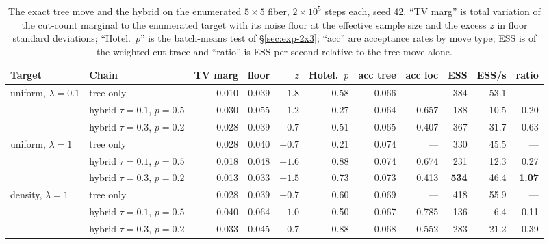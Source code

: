 \documentclass[11pt]{article}
\begin{document}
\begin{table}[htbp]
\centering
\small
\begin{tabular}{llrrrrrrrrr}
\toprule
Target & Chain & TV marg & floor & $z$ & Hotel.\ $p$ & acc tree & acc loc & ESS & ESS/s & ratio \\
\midrule
uniform, $\lambda{=}0.1$ & tree only & 0.010 & 0.039 & $-1.8$ & 0.58 & 0.066 & --- & 384 & 53.1 & --- \\
 & hybrid $\tau{=}0.1$, $p{=}0.5$ & 0.030 & 0.055 & $-1.2$ & 0.27 & 0.064 & 0.657 & 188 & 10.5 & 0.20 \\
 & hybrid $\tau{=}0.3$, $p{=}0.2$ & 0.028 & 0.039 & $-0.7$ & 0.51 & 0.065 & 0.407 & 367 & 31.7 & 0.63 \\
\midrule
uniform, $\lambda{=}1$ & tree only & 0.028 & 0.040 & $-0.7$ & 0.21 & 0.074 & --- & 330 & 45.5 & --- \\
 & hybrid $\tau{=}0.1$, $p{=}0.5$ & 0.018 & 0.048 & $-1.6$ & 0.88 & 0.074 & 0.674 & 231 & 12.3 & 0.27 \\
 & hybrid $\tau{=}0.3$, $p{=}0.2$ & 0.013 & 0.033 & $-1.5$ & 0.73 & 0.073 & 0.413 & \textbf{534} & 46.4 & \textbf{1.07} \\
\midrule
density, $\lambda{=}1$ & tree only & 0.028 & 0.039 & $-0.7$ & 0.60 & 0.069 & --- & 418 & 55.9 & --- \\
 & hybrid $\tau{=}0.1$, $p{=}0.5$ & 0.040 & 0.064 & $-1.0$ & 0.50 & 0.067 & 0.785 & 136 & 6.4 & 0.11 \\
 & hybrid $\tau{=}0.3$, $p{=}0.2$ & 0.033 & 0.045 & $-0.7$ & 0.88 & 0.068 & 0.552 & 283 & 21.2 & 0.39 \\
\bottomrule
\end{tabular}
\caption{The exact tree move and the hybrid on the enumerated
  $5 \times 5$ fiber, $2 \times 10^5$ steps each, seed 42. ``TV
  marg'' is total variation of the cut-count marginal to the
  enumerated target with its noise floor at the effective sample
  size and the excess $z$ in floor standard deviations; ``Hotel.\
  $p$'' is the batch-means test of \S\ref{sec:exp-2x3}; ``acc'' are
  acceptance rates by move type; ESS is of the weighted-cut trace and
  ``ratio'' is ESS per second relative to the tree move
  alone.}\label{tab:hybrid-5x5}
\end{table}
\end{document}
